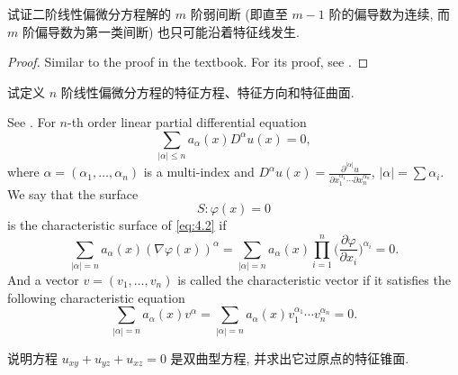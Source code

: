 \begin{exercise}
  试证二阶线性偏微分方程解的 $m$ 阶弱间断 (即直至 $m-1$ 阶的偏导数为连续, 而 $m$ 阶偏导数为第一类间断)
  也只可能沿着特征线发生.
\end{exercise}

\begin{proof}
  Similar to the proof in the textbook. For its proof,
  see \cite[\S2.1.2]{chen_2018}.
\end{proof}


\begin{exercise}
  试定义 $n$ 阶线性偏微分方程的特征方程、特征方向和特征曲面.
\end{exercise}

\begin{solution}
  See \cite[\S2.1.2]{chen_2018}.
  For $n$-th order linear partial differential equation
  \begin{equation}\label{eq:4.2}
    \sum_{|\alpha|\leq n} a_\alpha(x) D^\alpha u(x) = 0,
  \end{equation}
  where $\alpha=(\alpha_1,\ldots,\alpha_n)$ is a multi-index
  and $D^\alpha u(x) = \frac{\partial^{|\alpha|} u}{\partial x_1^{\alpha_1}\cdots\partial x_n^{\alpha_n}}$,
  $|\alpha| = \sum \alpha_i$. We say that the surface
  \begin{equation}\label{eq:4.3}
    S: \varphi(x) = 0
  \end{equation}
  is the characteristic surface of \eqref{eq:4.2} if
  \begin{equation}\label{eq:4.4}
    \sum_{|\alpha|=n} a_\alpha(x) (\nabla\varphi(x))^\alpha
      = \sum_{|\alpha|=n} a_\alpha(x) \prod_{i=1}^n
        \biggl(\frac{\partial\varphi}{\partial x_i}\biggr)^{\alpha_i} = 0.
  \end{equation}
  And a vector $v = (v_1,\ldots,v_n)$ is called the characteristic vector
  if it satisfies the following characteristic equation
  \begin{equation}\label{eq:4.5}
    \sum_{|\alpha|=n} a_\alpha(x) v^\alpha
      = \sum_{|\alpha|=n} a_\alpha(x) v_1^{\alpha_1} \cdots v_n^{\alpha_n} = 0.
  \end{equation}
\end{solution}


\begin{exercise}[7]
	说明方程 $u_{xy} + u_{yz} + u_{xz} = 0$ 是双曲型方程, 并求出它过原点的特征锥面.
\end{exercise}

